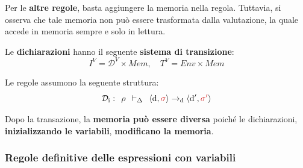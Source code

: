 \documentclass[a4paper]{article}
\begin{document}
 	\noindent
 	Per le \textbf{altre regole}, basta aggiungere la memoria nella regola. Tuttavia, si osserva che tale memoria non può essere trasformata dalla valutazione, la quale accede in memoria sempre e solo in lettura.\newline
 	
 	\noindent
 	\begin{boxdef}
 		Le \textcolor{Red3}{\textbf{dichiarazioni}} hanno il seguente \textbf{sistema di transizione}:
 		\begin{equation*}
 			I^{V} = \mathcal{D}^{V} \times Mem, \hspace{1em} T^{V} = Env \times Mem
 		\end{equation*}
 	\end{boxdef}
 	
 	\noindent
 	Le regole assumono la seguente struttura:
	\begin{equation*}
		\mathcal{D}_{\mathrm{i}} : \:\: \rho \:\: \vdash_{\Delta} \:\: \left\langle \mathrm{d}, \textcolor{Red3}{\sigma} \right\rangle \rightarrow_{\mathrm{d}} \left\langle \mathrm{d}', \textcolor{Red3}{\sigma'} \right\rangle
	\end{equation*}
 	
 	\noindent
 	Dopo la transazione, la \textbf{memoria può essere diversa} poiché le dichiarazioni, \textbf{inizializzando le variabili}, \textbf{modificano la memoria}.\newpage
 	
 	\subsubsection{Regole definitive delle espressioni con variabili}
 	
\end{document}
